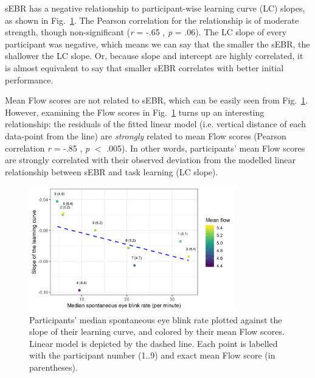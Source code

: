 \documentclass[fleqn,10pt]{wlscirep}
\newcommand{\nicewidth}{0.8\textwidth}
\begin{document}
sEBR has a negative relationship to participant-wise learning curve (LC) slopes, as shown in Fig.~\ref{fig:EBRvLC}. The Pearson correlation for the relationship is of moderate strength, though non-significant ({\it r} = -.65 , {\it p} = .06). The LC slope of every participant was negative, which means we can say that the smaller the sEBR, the shallower the LC slope. Or, because slope and intercept are highly correlated, it is almost equivalent to say that smaller sEBR correlates with better initial performance.

Mean Flow scores are not related to sEBR, which can be easily seen from Fig.~\ref{fig:EBRvLC}. However, examining the Flow scores in Fig.~\ref{fig:EBRvLC} turns up an interesting relationship: the residuals of the fitted linear model (i.e. vertical distance of each data-point from the line) are {\it strongly} related to mean Flow scores (Pearson correlation {\it r} = -.85 , {\it p} $<$ .005). In other words, participants' mean Flow scores are strongly correlated with their observed deviation from the modelled linear relationship between sEBR and task learning (LC slope).


\begin{figure}[!ht]
	\centering
	\includegraphics[width=\nicewidth]{lcurve_sbr_flowRL2}
	\caption{Participants' median spontaneous eye blink rate plotted against the slope of their learning curve, and colored by their mean Flow scores. Linear model is depicted by the dashed line. Each point is labelled with the participant number (1..9) and exact mean Flow score (in parentheses).}
	\label{fig:EBRvLC}
\end{figure}
\end{document}
